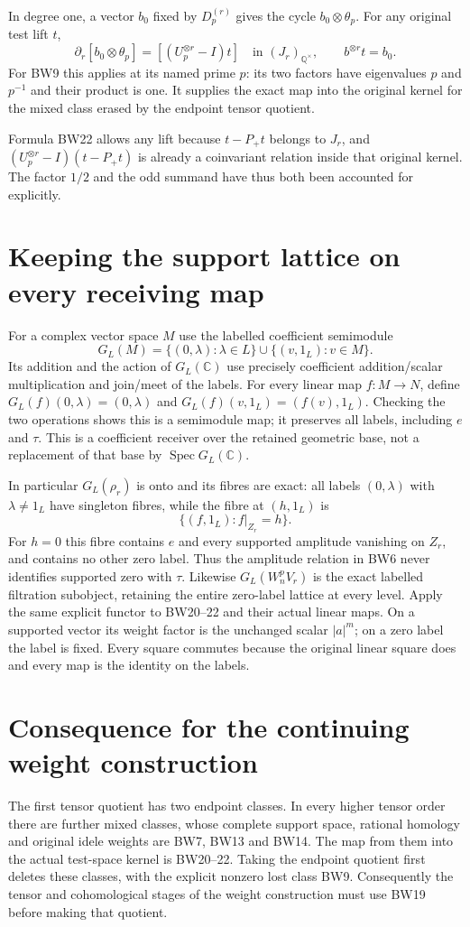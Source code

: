 \documentclass[11pt]{article}
\newcommand{\C}{\mathbb C}
\newcommand{\Q}{\mathbb Q}
\DeclareMathOperator{\Spec}{Spec}
\begin{document}
In degree one, a vector $b_0$ fixed by $D_p^{(r)}$ gives the cycle
$b_0\otimes\theta_p$. For any original test lift $t$,
\[
 \partial_r[b_0\otimes\theta_p]=[(U_p^{\otimes r}-I)t]
       \quad\text{in }(J_r)_{\Q^\times},\qquad b^{\otimes r}t=b_0.
 \tag{BW22}
\]
For BW9 this applies at its named prime $p$: its two factors have
eigenvalues $p$ and $p^{-1}$ and their product is one. It supplies
the exact map into the original kernel for the mixed class erased
by the endpoint tensor quotient.

Formula BW22 allows any lift because $t-P_+t$ belongs to $J_r$,
and $(U_p^{\otimes r}-I)(t-P_+t)$ is already a coinvariant
relation inside that original kernel. The factor $1/2$ and the
odd summand have thus both been accounted for explicitly.

\section{Keeping the support lattice on every receiving map}
For a complex vector space $M$ use the labelled coefficient
semimodule
\[
 G_L(M)=\{(0,\lambda):\lambda\in L\}\cup\{(v,1_L):v\in M\}.
 \tag{BW23}
\]
Its addition and the action of $G_L(\C)$ use precisely coefficient
addition/scalar multiplication and join/meet of the labels.
For every linear map $f:M\to N$, define
$G_L(f)(0,\lambda)=(0,\lambda)$ and
$G_L(f)(v,1_L)=(f(v),1_L)$. Checking the two operations shows this
is a semimodule map; it preserves all labels, including $e$ and
$\tau$. This is a coefficient receiver over the retained geometric
base, not a replacement of that base by $\Spec G_L(\C)$.

In particular $G_L(\rho_r)$ is onto and its fibres are exact:
all labels $(0,\lambda)$ with $\lambda\ne1_L$ have singleton
fibres, while the fibre at $(h,1_L)$ is
\[
 \{(f,1_L):f|_{Z_r}=h\}.
 \tag{BW24}
\]
For $h=0$ this fibre contains $e$ and every supported amplitude
vanishing on $Z_r$, and contains no other zero label. Thus the
amplitude relation in BW6 never identifies supported zero with
$\tau$. Likewise $G_L(W_n^pV_r)$ is the exact labelled filtration
subobject, retaining the entire zero-label lattice at every level.
Apply the same explicit functor to BW20--22 and their actual
linear maps. On a supported vector its weight factor is the
unchanged scalar $|a|^m$; on a zero label the label is fixed.
Every square commutes because the original linear square does
and every map is the identity on the labels.

\section{Consequence for the continuing weight construction}
The first tensor quotient has two endpoint classes. In every
higher tensor order there are further mixed classes, whose
complete support space, rational homology and original idele
weights are BW7, BW13 and BW14. The map from them into the actual
test-space kernel is BW20--22. Taking the endpoint quotient first
deletes these classes, with the explicit nonzero lost class BW9.
Consequently the tensor and cohomological stages of the weight
construction must use BW19 before making that quotient.
\end{document}
